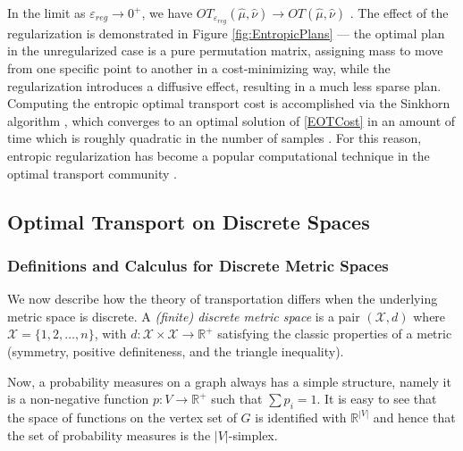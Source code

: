\documentclass{article}
\newcommand{\R}{\mathbb{R}}
\newcommand{\X}{\mathcal{X}}
\begin{document}
In the limit as \(\varepsilon_{reg} \to 0^+\), we have \(OT_{\varepsilon_{reg}}(\hat{\mu}, \hat{\nu}) \to OT(\hat{\mu}, \hat{\nu})\) \cite{gabrielComputationalOptimalTransport2019}. The effect of the regularization is demonstrated in Figure \ref{fig:EntropicPlans} --- the optimal plan in the unregularized case is a pure permutation matrix, assigning mass to move from one specific point to another in a cost-minimizing way, while the regularization introduces a diffusive effect, resulting in a much less sparse plan.
Computing the entropic optimal transport cost is accomplished via the Sinkhorn algorithm \cite{sinkhornConcerningNonnegativeMatrices1967, sinkhornDiagonalEquivalenceMatrices1967}, which converges to an optimal solution of \eqref{EOTCost} in an amount of time which is roughly quadratic in the number of samples \cite{cuturiSinkhornDistancesLightspeed2013}. For this reason, entropic regularization has become a popular computational technique in the optimal transport community \cite{genevayLearningGenerativeModels2018, mena2019statistical, cuturiDifferentiableRankingSorting2019, pooladian2021entropic, masudMultivariateSoftRank2023, mallery2025synthesis, werenskiOptimalTransportMaps2024, montesumaRecentAdvancesOptimal2025}.

\subsection{Optimal Transport on Discrete Spaces}
\label{DOTDeets}
\subsubsection{Definitions and Calculus for Discrete Metric Spaces}
We now describe how the theory of transportation differs when the underlying metric space is discrete. A \emph{(finite) discrete metric space} is a pair \((\X, d)\) where \(\X = \{1,2,\dots,n\}\), with \(d: \X\times\X\to\R^{+}\) satisfying the classic properties of a metric (symmetry, positive definiteness, and the triangle inequality).

Now, a probability measures on a graph always has a simple structure, namely it is a non-negative function \(p:V\to\R^+\) such that \(\sum p_i = 1\). It is easy to see that the space of functions on the vertex set of \(G\) is identified with \(\R^{|V|}\) and hence that the set of probability measures is the \(|V|\)-simplex.
\end{document}
